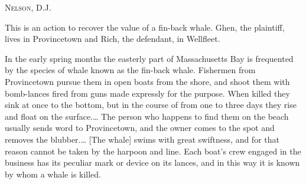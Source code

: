 


\opinion \textsc{Nelson}, D.J.

This is an action to recover the value of a fin-back whale. Ghen, the
plaintiff,
lives in Provincetown and Rich, the defendant, in Wellfleet.

In the early spring months the easterly part of Massachusetts Bay is frequented
by the species of whale known as the fin-back whale. Fishermen from Provincetown
pursue them in open boats from the shore, and shoot them with bomb-lances fired
from guns made expressly for the purpose. When killed they sink at once to the
bottom, but in the course of from one to three days they rise and float on the
surface.\ldots
The person who happens
to find them on the beach usually sends word to Provincetown, and the owner
comes to the spot and removes the blubber.\ldots
[The whale] swims with great swiftness, and for that
reason cannot be taken by the harpoon and line. Each boat's crew engaged in the
business has its peculiar mark or device on its lances, and in this way it is
known by whom a whale is killed.

